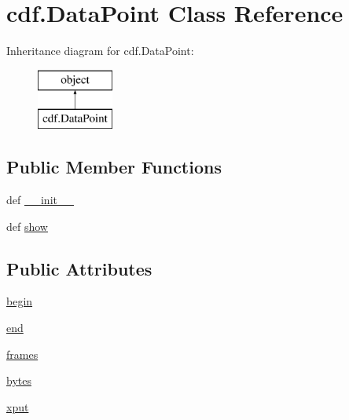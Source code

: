 \hypertarget{classcdf_1_1_data_point}{\section{cdf.\-Data\-Point Class Reference}
\label{classcdf_1_1_data_point}
}
Inheritance diagram for cdf.\-Data\-Point\-:\begin{figure}[H]
\begin{center}
\leavevmode
\includegraphics[height=2.000000cm]{classcdf_1_1_data_point}
\end{center}
\end{figure}
\subsection*{Public Member Functions}
\begin{DoxyCompactItemize}
\item 
def \hyperlink{classcdf_1_1_data_point_a99f0e404b101fd170b6b3a05478d43a1}{\-\_\-\-\_\-init\-\_\-\-\_\-}
\item 
def \hyperlink{classcdf_1_1_data_point_a9115a84a0ed18a7f79e18b63928e72ce}{show}
\end{DoxyCompactItemize}
\subsection*{Public Attributes}
\begin{DoxyCompactItemize}
\item 
\hyperlink{classcdf_1_1_data_point_ad73a5f02299af4166f516ebcf70aa2be}{begin}
\item 
\hyperlink{classcdf_1_1_data_point_a02ee1a6a3e1cad6aaca067751c30952c}{end}
\item 
\hyperlink{classcdf_1_1_data_point_a52817194109fae73a5cc2d7595797a65}{frames}
\item 
\hyperlink{classcdf_1_1_data_point_aa098d368a57503bfc327e76f34d211e4}{bytes}
\item 
\hyperlink{classcdf_1_1_data_point_adc4cd93ff514639bc9bb75301433567a}{xput}
\end{DoxyCompactItemize}


